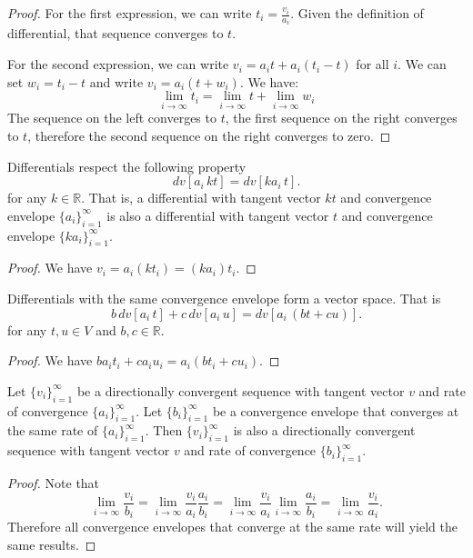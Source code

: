 \documentclass[11pt,letterpaper,fleqn]{memoir}
\begin{document}
\begin{proof}
For the first expression, we can write $t_i = \frac{v_i}{a_i}$. Given the definition of differential, that sequence converges to $t$.	
	
For the second expression, we can write $v_i = a_i t + a_i \left(t_i - t\right)$ for all $i$. We can set $w_i = t_i - t$ and write $v_i = a_i(t + w_i)$. We have:
$$\lim\limits_{i \to \infty} t_i = \lim\limits_{i \to \infty} t + \lim\limits_{i \to \infty} w_i $$
The sequence on the left converges to $t$, the first sequence on the right converges to $t$, therefore the second sequence on the right converges to zero.
\end{proof}

\begin{prop}
	Differentials respect the following property
	$$ dv[a_i \, kt] = dv[k a_i \, t].$$
	for any $k \in \mathbb{R}$. That is, a differential with tangent vector $kt$ and convergence envelope $\{a_i\}_{i=1}^{\infty}$ is also a differential with tangent vector $t$ and convergence envelope $\{ka_i\}_{i=1}^{\infty}$.
\end{prop}

\begin{proof}
	We have $v_i = a_i (k t_i) = (k a_i) t_i$.
\end{proof}

\begin{prop}
	Differentials with the same convergence envelope form a vector space. That is
	$$ b \, dv[a_i \, t] + c \, dv[a_i \, u] = dv[a_i \, (bt+cu)].$$
	for any $t,u \in V$ and $b,c \in \mathbb{R}$.
\end{prop}

\begin{proof}
	We have $b a_i t_i + c a_i u_i = a_i (b t_i + c u_i)$.
\end{proof}

\iffalse

\begin{prop}
	Let $\{v_i\}_{i=1}^{\infty}$ be a directionally convergent sequence with tangent vector $v$ and rate of convergence $\{a_i\}_{i=1}^{\infty}$. Let $\{b_i\}_{i=1}^{\infty}$ be a convergence envelope that converges at the same rate of $\{a_i\}_{i=1}^{\infty}$. Then $\{v_i\}_{i=1}^{\infty}$ is also a directionally convergent sequence with tangent vector $v$ and rate of convergence $\{b_i\}_{i=1}^{\infty}$.
\end{prop}

\begin{proof}
	Note that 
	$$ \lim\limits_{i \to \infty} \frac{v_i}{b_i} = \lim\limits_{i \to \infty} \frac{v_i}{a_i}\frac{a_i}{b_i} = \lim\limits_{i \to \infty} \frac{v_i}{a_i} \lim\limits_{i \to \infty} \frac{a_i}{b_i} = \lim\limits_{i \to \infty} \frac{v_i}{a_i}.$$
	Therefore all convergence envelopes that converge at the same rate will yield the same results.
\end{proof}
\end{document}
